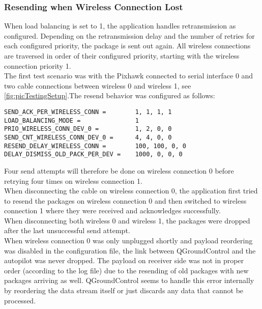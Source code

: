 \subsubsection{Resending when Wireless Connection Lost}
%
When load balancing is set to 1, the application handles retransmission as configured. Depending on the retransmission delay and the number of retries for each configured priority, the package is sent out again. All wireless connections are traversed in order of their configured priority, starting with the wireless connection priority 1.\\
The first test scenario was with the Pixhawk connected to serial interface 0 and two cable connections between wireless 0 and wireless 1, see \autoref{fig:picTestingSetup}.The resend behavior was configured as follows:
\begin{lstlisting}
SEND_ACK_PER_WIRELESS_CONN =		1, 1, 1, 1
LOAD_BALANCING_MODE =				1
PRIO_WIRELESS_CONN_DEV_0 =			1, 2, 0, 0
SEND_CNT_WIRELESS_CONN_DEV_0 =		4, 4, 0, 0
RESEND_DELAY_WIRELESS_CONN =		100, 100, 0, 0
DELAY_DISMISS_OLD_PACK_PER_DEV =	1000, 0, 0, 0
\end{lstlisting}
Four send attempts will therefore be done on wireless connection 0 before retrying four times on wireless connection 1.\\
When disconnecting the cable on wireless connection 0, the application first tried to resend the packages on wireless connection 0 and then switched to wireless connection 1 where they were received and acknowledges successfully.\\
When disconnecting both wireless 0 and wireless 1, the packages were dropped after the last unsuccessful send attempt.\\
When wireless connection 0 was only unplugged shortly and payload reordering was disabled in the configuration file, the link between QGroundControl and the autopilot was never dropped. The payload on receiver side was not in proper order (according to the log file) due to the resending of old packages with new packages arriving as well. QGroundControl seems to handle this error internally by reordering the data stream itself or just discards any data that cannot be processed.
%
